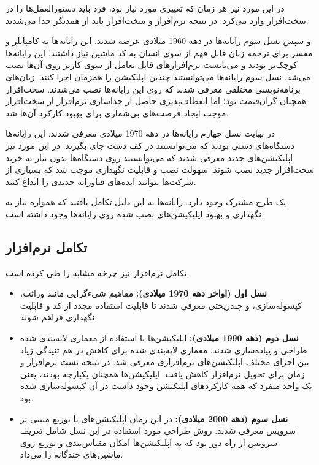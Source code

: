 در این مورد نیز هر زمان که تغییری مورد نیاز بود، فرد باید دستورالعمل‌ها را در سخت‌افزار وارد می‌کرد. در نتیجه نرم‌افزار و سخت‌افزار باید از همدیگر جدا می‌شدند.

و سپس نسل سوم رایانه‌ها در دهه 1960 میلادی عرضه شدند. این رایانه‌ها به کامپایلر و مفسر برای ترجمه زبان قابل فهم از سوی انسان به کد ماشین نیاز داشتند. این رایانه‌ها کوچک‌تر بودند و می‌بایست نرم‌افزارهای قابل تعامل از سوی کاربر روی آن‌ها نصب می‌شد. نسل سوم رایانه‌ها می‌توانستند چندین اپلیکیشن را همزمان اجرا کنند. زبان‌های برنامه‌نویسی مختلفی معرفی شدند که روی این رایانه‌ها نصب می‌شدند. سخت‌افزار همچنان گران‌قیمت بود؛ اما انعطاف‌پذیری حاصل از جداسازی نرم‌افزار از سخت‌افزار موجب ایجاد فرصت‌های بی‌شماری برای بهبود کارکرد آن‌ها شد.

در نهایت نسل چهارم رایانه‌ها در دهه 1970 میلادی معرفی شدند. این رایانه‌ها دستگاه‌های دستی بودند که می‌توانستند در کف دست جای بگیرند. در این مورد نیز اپلیکیشن‌های جدید معرفی شدند که می‌توانستند روی دستگاه‌ها بدون نیاز به خرید سخت‌افزار جدید نصب شوند. سهولت نصب و قابلیت نگهداری موجب شد که بسیاری از شرکت‌ها بتوانند ایده‌های فناورانه جدیدی را ابداع کنند.

یک طرح مشترک وجود دارد. رایانه‌ها به این دلیل تکامل یافتند که همواره نیاز به نگهداری و بهبود اپلیکیشن‌های نصب شده روی رایانه‌ها وجود داشته است.

\subsection{تکامل نرم‌افزار}
تکامل نرم‌افزار نیز چرخه مشابه را طی کرده است.
\begin{itemize}

\item
\textbf{
نسل اول (اواخر دهه 1970 میلادی):
}
مفاهیم شیءگرایی مانند وراثت، کپسوله‌سازی، و چندریختی معرفی شدند تا قابلیت استفاده مجدد از کد و قابلیت نگهداری فراهم شوند.

\item
\textbf{
نسل دوم (دهه 1990 میلادی):
}
اپلیکیشن‌ها با استفاده از معماری لایه‌بندی شده طراحی و پیاده‌سازی شدند. معماری لایه‌بندی شده برای کاهش در هم تنیدگی زیاد بین اجزای مختلف اپلیکیشن‌های نرم‌افزاری معرفی شد. در نتیجه تست نرم‌افزار و زمان برای تحویل نرم‌افزار کاهش یافت. اپلیکیشن‌ها همچنان یکپارچه بودند، یعنی یک واحد منفرد که همه کارکردهای اپلیکیشن وجود داشت در آن کپسوله‌سازی شده بود.

\item
\textbf{
نسل سوم (دهه 2000 میلادی):
}
در این زمان اپلیکیشن‌های با توزیع مبتنی بر سرویس معرفی شدند. روش طراحی مورد استفاده در این نسل شامل تعریف سرویس از راه دور بود که به اپلیکیشن‌ها امکان مقیاس‌بندی و توزیع روی ماشین‌های چندگانه را می‌داد.

\end{itemize}

